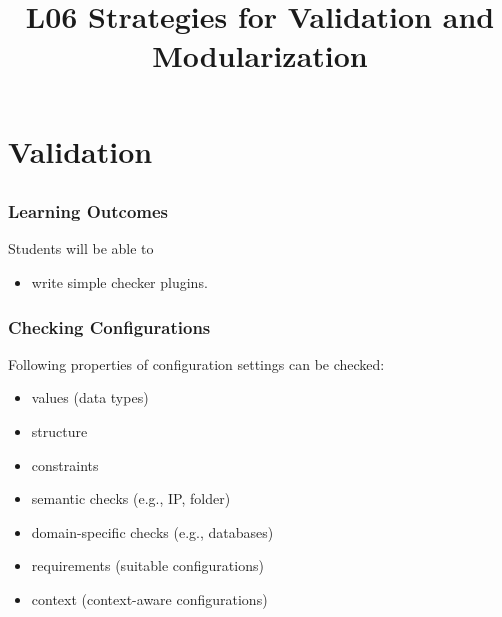 

\title{L06 Strategies for Validation and Modularization}




\section{Validation}
\subsection{}

\begin{frame}
	\frametitle{Learning Outcomes}
	Students will be able to
	\begin{itemize}
	\item write simple checker plugins.
	\end{itemize}
\end{frame}

\begin{frame}
	\frametitle{Checking Configurations}

	Following properties of configuration settings can be checked:

	\begin{itemize}[<+-| alert@+>]
	\item values (data types)
	\item structure
	\item constraints
	\item semantic checks (e.g., IP, folder)
	\item domain-specific checks (e.g., databases)
	\item requirements (suitable configurations)
	\item context (context-aware configurations)
	\end{itemize}
\end{frame}

